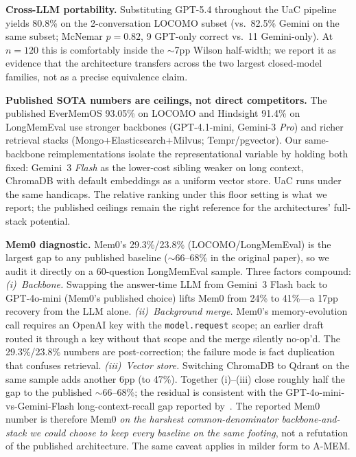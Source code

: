 \textbf{Cross-LLM portability.} Substituting GPT-5.4 throughout the UaC pipeline yields 80.8\% on the 2-conversation LOCOMO subset (vs.\ 82.5\% Gemini on the same subset; McNemar $p{=}0.82$, 9 GPT-only correct vs.\ 11 Gemini-only). At $n{=}120$ this is comfortably inside the $\sim$7pp Wilson half-width; we report it as evidence that the architecture transfers across the two largest closed-model families, not as a precise equivalence claim.

\textbf{Published SOTA numbers are ceilings, not direct competitors.} The published EverMemOS 93.05\% on LOCOMO and Hindsight 91.4\% on LongMemEval use stronger backbones (GPT-4.1-mini, Gemini-3 \emph{Pro}) and richer retrieval stacks (Mongo+Elasticsearch+Milvus; Tempr/pgvector). Our same-backbone reimplementations isolate the representational variable by holding both fixed: Gemini~3 \emph{Flash} as the lower-cost sibling weaker on long context, ChromaDB with default embeddings as a uniform vector store. UaC runs under the same handicaps. The relative ranking under this floor setting is what we report; the published ceilings remain the right reference for the architectures' full-stack potential.

\textbf{Mem0 diagnostic.}\label{sec:mem0-diagnostic} Mem0's 29.3\%/23.8\% (LOCOMO/LongMemEval) is the largest gap to any published baseline ($\sim$66--68\% in the original paper), so we audit it directly on a 60-question LongMemEval sample. Three factors compound: \emph{(i)~Backbone.} Swapping the answer-time LLM from Gemini~3 Flash back to GPT-4o-mini (Mem0's published choice) lifts Mem0 from 24\% to 41\%---a 17pp recovery from the LLM alone. \emph{(ii)~Background merge.} Mem0's memory-evolution call requires an OpenAI key with the \texttt{model.request} scope; an earlier draft routed it through a key without that scope and the merge silently no-op'd. The 29.3\%/23.8\% numbers are post-correction; the failure mode is fact duplication that confuses retrieval. \emph{(iii)~Vector store.} Switching ChromaDB to Qdrant on the same sample adds another 6pp (to 47\%). Together (i)--(iii) close roughly half the gap to the published $\sim$66--68\%; the residual is consistent with the GPT-4o-mini-vs-Gemini-Flash long-context-recall gap reported by~\citet{wu2025longmemeval}. The reported Mem0 number is therefore Mem0 \emph{on the harshest common-denominator backbone-and-stack we could choose to keep every baseline on the same footing}, not a refutation of the published architecture. The same caveat applies in milder form to A-MEM.

